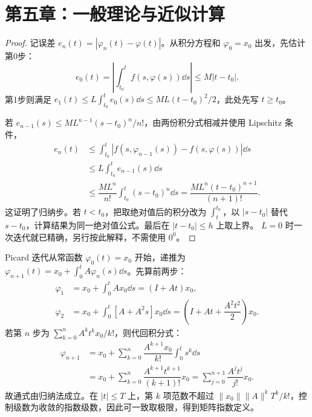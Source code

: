 \section{第五章：一般理论与近似计算}
\begin{proof}
记误差 $e_n(t)=|\varphi_n(t)-\varphi(t)|$。从积分方程和 $\varphi_0=x_0$ 出发，先估计第0步：
\[
e_0(t)=\left|\int_{t_0}^tf(s,\varphi(s))\dd s\right|
\le M|t-t_0|.
\]
第1步则满足 $\displaystyle e_1(t)\le L\int_{t_0}^te_0(s)\dd s\le ML(t-t_0)^2/2$，此处先写 $t\ge t_0$。

若 $e_{n-1}(s)\le ML^{n-1}(s-t_0)^n/n!$，由两份积分式相减并使用 Lipschitz 条件，
\[
\begin{aligned}
e_n(t)&\le\int_{t_0}^t|f(s,\varphi_{n-1}(s))-f(s,\varphi(s))|\dd s\\
&\le L\int_{t_0}^te_{n-1}(s)\dd s\\
&\le\dfrac{ML^n}{n!}\int_{t_0}^t(s-t_0)^n\dd s
=\dfrac{ML^n(t-t_0)^{n+1}}{(n+1)!}.
\end{aligned}
\]
这证明了归纳步。若 $t<t_0$，把取绝对值后的积分改为 $\displaystyle \int_t^{t_0}$，以 $|s-t_0|$ 替代 $s-t_0$，计算结果为同一绝对值公式。最后在 $|t-t_0|\le h$ 上取上界。
$L=0$ 时一次迭代就已精确，另行按此解释，不需使用 $0^0$。
\end{proof}
Picard 迭代从常函数 $\varphi_0(t)=x_0$ 开始，递推为 $\displaystyle \varphi_{n+1}(t)=x_0+\int_0^tA\varphi_n(s)\dd s$。先算前两步：
\[
\begin{aligned}
\varphi_1&=x_0+\int_0^tAx_0\dd s=(I+At)x_0,\\
\varphi_2&=x_0+\int_0^t[A+A^2s]x_0\dd s
=\left(I+At+\dfrac{A^2t^2}{2}\right)x_0.
\end{aligned}
\]
若第 $n$ 步为 $\sum_{k=0}^nA^kt^kx_0/k!$，则代回积分式：
\[
\begin{aligned}
\varphi_{n+1}
&=x_0+\sum_{k=0}^n\dfrac{A^{k+1}x_0}{k!}\int_0^t s^k\dd s\\
&=x_0+\sum_{k=0}^n\dfrac{A^{k+1}t^{k+1}}{(k+1)!}x_0
=\sum_{j=0}^{n+1}\dfrac{A^jt^j}{j!}x_0.
\end{aligned}
\]
故通式由归纳法成立。在 $|t|\le T$ 上，第 $k$ 项范数不超过 $\|x_0\|\|A\|^kT^k/k!$，控制级数为收敛的指数级数，因此可一致取极限，得到矩阵指数定义。
